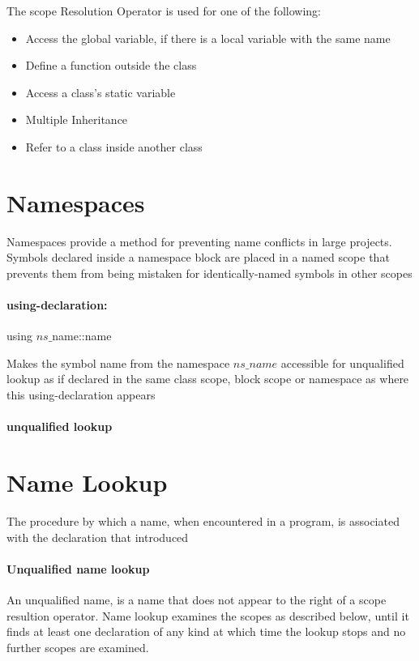 \documentclass[8pt]{extreport}
\begin{document}
The scope Resolution Operator is used for one of the following:

\begin{itemize}
\item Access the global variable, if there is a local variable with the same name
\item Define a function outside the class
\item Access a class's static variable
\item Multiple Inheritance
\item Refer to a class inside another class
\end{itemize}

\section{Namespaces}

Namespaces provide a method for preventing name conflicts in large projects. Symbols declared inside a namespace block are placed in a named scope that prevents them from being mistaken for identically-named symbols in other scopes

\paragraph{using-declaration:} 
\begin{center}
using $ns\_$name::name
\end{center}
Makes the symbol name from the namespace $ns\_name$ accessible for unqualified lookup as if declared in the same class scope, block scope or namespace as where this using-declaration appears

\paragraph{unqualified lookup}

\section{Name Lookup}

The procedure by which a name, when encountered  in a program, is associated with the declaration that introduced


\paragraph{Unqualified name lookup} An unqualified name, is a name that does not appear to the right of a scope resultion operator. Name lookup examines the scopes as described below, until it finds at least one declaration of any kind at which time the lookup stops and no further scopes are examined.\\
\end{document}
